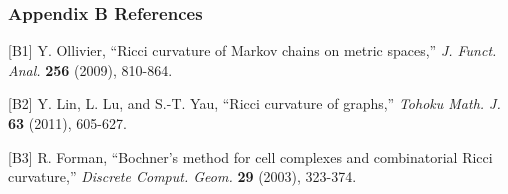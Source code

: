 \documentclass[
]{article}
\begin{document}
\subsubsection{Appendix B References}\label{appendix-b-references}

{[}B1{]} Y. Ollivier, ``Ricci curvature of Markov chains on metric
spaces,'' \emph{J. Funct. Anal.} \textbf{256} (2009), 810-864.

{[}B2{]} Y. Lin, L. Lu, and S.-T. Yau, ``Ricci curvature of graphs,''
\emph{Tohoku Math. J.} \textbf{63} (2011), 605-627.

{[}B3{]} R. Forman, ``Bochner's method for cell complexes and
combinatorial Ricci curvature,'' \emph{Discrete Comput. Geom.}
\textbf{29} (2003), 323-374.
\end{document}
